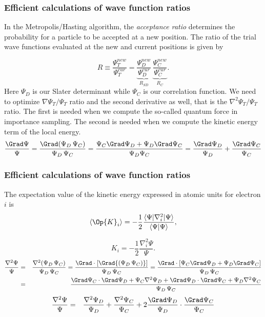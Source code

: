 \frame
 {
   \frametitle{Efficient calculations of wave function ratios}
 \begin{small}
 {\scriptsize

In the Metropolis/Hasting algorithm, the \emph{acceptance ratio} determines the probability for a particle  to be accepted at a new position. The ratio of the trial wave functions evaluated at the new and current positions is given by

\begin{equation}\label{acceptanceRatio}
\boxed{R \equiv \frac{\Psi_{T}^{new}}{\Psi_{T}^{cur}} = \underbrace{\frac{\Psi_{D}^{new}}{\Psi_{D}^{cur}}}_{R_{SD}}\, \underbrace{\frac{\Psi_{C}^{new}}{\Psi_{C}^{cur}}}_{R_{C}}.}
\end{equation}
Here $\Psi_{D}$ is our Slater determinant while $\Psi_{C}$ is our correlation function. 
We need to optimize $\nabla \Psi_T / \Psi_T$ ratio and the second derivative as well, that is
the $\nabla^2 \Psi_T/\Psi_T$ ratio. The first is needed when we compute the so-called quantum force in importance sampling.
The second is needed when we compute the kinetic energy term of the local energy.
\[
\frac{\Grad \Psi}{\Psi}  = \frac{\Grad (\Psi_{D} \, \Psi_{C})}{\Psi_{D} \, \Psi_{C}}  =  \frac{ \Psi_C \Grad \Psi_{D} + \Psi_{D} \Grad \Psi_{C}}{\Psi_{D} \Psi_{C}} = \frac{\Grad \Psi_{D}}{\Psi_{D}} + \frac{\Grad  \Psi_C}{ \Psi_C}
\]
 }
 \end{small}
 }


\frame
 {
   \frametitle{Efficient calculations of wave function ratios}
 \begin{small}
 {\scriptsize

The expectation value of the kinetic energy expressed in atomic units for electron $i$ is 
\begin{equation}
 \langle \Op{K}_i \rangle = -\frac{1}{2}\frac{\langle\Psi|\nabla_{i}^2|\Psi \rangle}{\langle\Psi|\Psi \rangle},
\end{equation}

\begin{equation}\label{kineticE}
K_i = -\frac{1}{2}\frac{\nabla_{i}^{2} \Psi}{\Psi}.
\end{equation}
\begin{eqnarray}
\frac{\nabla^2 \Psi}{\Psi} & = & \frac{\nabla^2 ({\Psi_{D} \,  \Psi_C})}{\Psi_{D} \,  \Psi_C} = \frac{\Grad \cdot [\Grad {(\Psi_{D} \,  \Psi_C)}]}{\Psi_{D} \,  \Psi_C} = \frac{\Grad \cdot [ \Psi_C \Grad \Psi_{D} + \Psi_{D} \Grad  \Psi_C]}{\Psi_{D} \,  \Psi_C}\nonumber\\
&  = & \frac{\Grad  \Psi_C \cdot \Grad \Psi_{D} +  \Psi_C \nabla^2 \Psi_{D} + \Grad \Psi_{D} \cdot \Grad  \Psi_C + \Psi_{D} \nabla^2  \Psi_C}{\Psi_{D} \,  \Psi_C}\nonumber\\
\end{eqnarray}
\begin{eqnarray}
\frac{\nabla^2 \Psi}{\Psi}
& = & \frac{\nabla^2 \Psi_{D}}{\Psi_{D}} + \frac{\nabla^2  \Psi_C}{ \Psi_C} + 2 \frac{\Grad \Psi_{D}}{\Psi_{D}}\cdot\frac{\Grad  \Psi_C}{ \Psi_C}
\end{eqnarray}
 }
 \end{small}
 }


